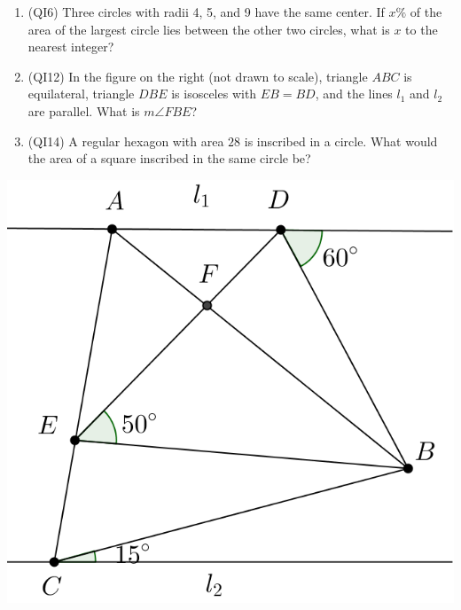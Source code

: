 \documentclass[10pt,paper=letter]{scrartcl}
\begin{document}
\begin{minipage}{.70\textwidth}
  \begin{enumerate}
    \item (QI6) Three circles with radii 4, 5, and 9 have the same center. If $x\%$ of the area of the largest circle lies between the other two circles, what is $x$ to the nearest integer?
    \item (QI12) In the figure on the right (not drawn to scale), triangle $ABC$ is equilateral, triangle $DBE$ is isosceles with $EB = BD$, and the lines $l_1$ and $l_2$ are parallel. What is $m\angle FBE$?
    \item (QI14) A regular hexagon with area $28$ is inscribed in a circle. What would the area of a square inscribed in the same circle be?
  \end{enumerate}
\end{minipage}
\begin{minipage}{.30\textwidth}
  \begin{center}
  \includegraphics[width=.90\textwidth]{qi12.png}
  \end{center}
\end{minipage}
\end{document}
